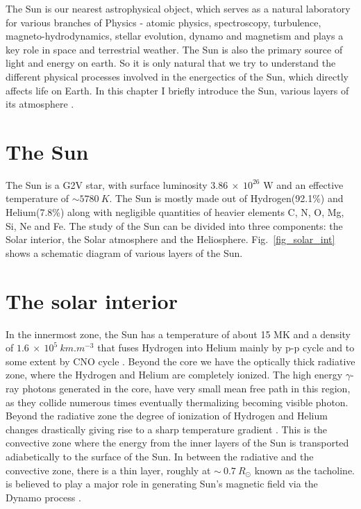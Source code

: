 \justifying

The Sun is our nearest astrophysical object, which serves as a natural laboratory for various branches of Physics - atomic physics, spectroscopy, turbulence, magneto-hydrodynamics, stellar evolution, dynamo and magnetism and plays a key role in  space and terrestrial weather. The Sun is also the primary source of light and energy on earth. So it is only natural that we try to understand the different physical processes involved in the energectics of the Sun, which directly affects life on Earth. In this chapter I briefly introduce the Sun, various layers of its atmosphere . 

\section{The Sun}\label{Sun}

The Sun is a G2V star, with surface luminosity $3.86~\times~10^{26}$ W and an effective temperature of $\sim 5780~K$. The Sun is mostly made out of Hydrogen(92.1\%) and Helium(7.8\%) along with negligible quantities of heavier elements C, N, O, Mg, Si, Ne and Fe. The study of the Sun can be divided into three components: the Solar interior, the Solar atmosphere and the Heliosphere. Fig.~\ref{fig_solar_int} shows a schematic diagram of various layers of the Sun. 

\section{The solar interior}\label{solar_int}

In the innermost zone, the Sun has a temperature of about 15 MK and a density of $1.6~\times~10^{5}~km.m^{-3}$ that fuses Hydrogen into Helium mainly by p-p cycle \citep{bethe38} and to some extent by CNO cycle \citep{bethe39}. Beyond the core we have the optically thick radiative zone, where the Hydrogen and Helium are completely ionized. The high energy $\gamma$-ray photons generated in the core, have very small mean free path in this region, as they collide numerous times eventually thermalizing  becoming visible photon. Beyond the radiative zone the degree of ionization of Hydrogen and Helium changes drastically giving rise to a sharp temperature gradient . This is the convective zone where the energy from the inner layers of the Sun is transported adiabetically to the surface of the Sun. In between the radiative and the convective zone, there is a thin layer, roughly at $\sim~0.7~R_{\odot}$ known as the tacholine.  is believed to play a major role in generating Sun's magnetic field via the Dynamo process \citep{corbard01}.

